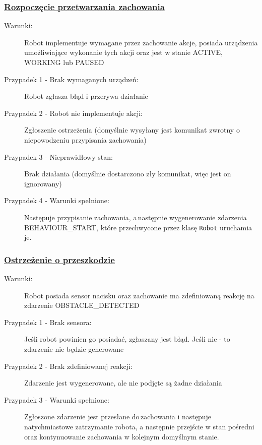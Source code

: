 \subsubsection{\underline{Rozpoczęcie przetwarzania zachowania}}


\begin{description}
    \item[Warunki:]Robot implementuje wymagane przez zachowanie akcje, posiada urządzenia umożliwiające wykonanie tych akcji oraz jest w stanie ACTIVE, WORKING lub PAUSED
    \item[Przypadek 1 - Brak wymaganych urządzeń:]Robot zgłasza błąd i przerywa działanie
        

    \item[Przypadek 2 - Robot nie implementuje akcji:]Zgłoszenie ostrzeżenia (domyślnie wysyłany jest komunikat zwrotny o niepowodzeniu przypisania zachowania)
        

    \item[Przypadek 3 - Nieprawidłowy stan:]Brak działania (domyślnie dostarczono zły komunikat, więc jest on ignorowany)
        

    \item[Przypadek 4 - Warunki spełnione:]Następuje przypisanie zachowania, a\,następnie wygenerowanie zdarzenia BEHAVIOUR\_START, które przechwycone przez klasę {\tt Robot} uruchamia je.
        
\end{description}

\subsubsection{\underline{Ostrzeżenie o przeszkodzie}}

\begin{description}
    \item[Warunki:]Robot posiada sensor nacisku oraz zachowanie ma zdefiniowaną reakcję na zdarzenie OBSTACLE\_DETECTED
    \item[Przypadek 1 - Brak sensora:]Jeśli robot powinien go posiadać, zgłaszany jest błąd. Jeśli nie - to zdarzenie nie będzie generowane
        
    \item[Przypadek 2 - Brak zdefiniowanej reakcji:]Zdarzenie jest wygenerowane, ale nie podjęte są żadne działania
        
    \item[Przypadek 3 - Warunki spełnione:]Zgłoszone zdarzenie jest przesłane do\,zachowania i następuje natychmiastowe zatrzymanie robota, a następnie przejście w stan pośredni oraz kontynuowanie zachowania w kolejnym domyślnym stanie.\\
        
\end{description}

